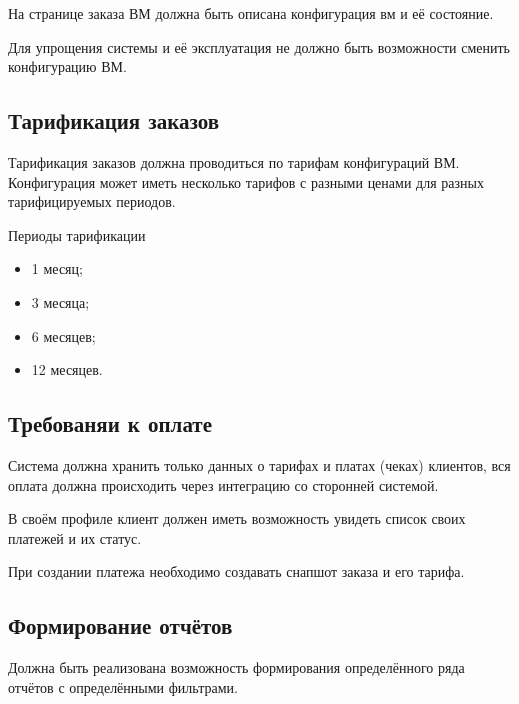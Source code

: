 На странице заказа ВМ должна быть описана конфигурация вм и её состояние.


Для упрощения системы и её эксплуатация не должно быть возможности сменить конфигурацию ВМ. 

\subsection{Тарификация заказов}\label{sec:order_tarif}

Тарификация заказов должна проводиться по тарифам конфигураций ВМ. Конфигурация может иметь несколько тарифов с разными ценами для разных тарифицируемых периодов. 


Периоды тарификации
\begin{itemize}
  \item 1 месяц;
  \item 3 месяца; 
  \item 6 месяцев;
  \item 12 месяцев.
\end{itemize}

\subsection{Требованяи к оплате}\label{sec:order_pay}
Система должна хранить только данных о тарифах и платах (чеках) клиентов, вся оплата должна происходить через интеграцию со сторонней системой.


В своём профиле клиент должен иметь возможность увидеть список своих платежей и их статус.


При создании платежа необходимо создавать снапшот заказа и его тарифа.

\subsection{Формирование отчётов}\label{sec:report_gen}
Должна быть реализована возможность формирования определённого ряда отчётов с определёнными фильтрами.

